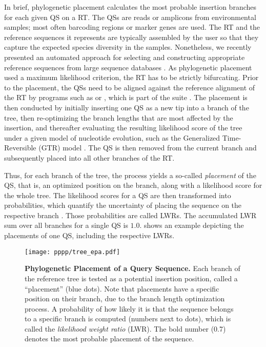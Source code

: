 In brief, phylogenetic placement calculates the most probable insertion branches for each given \acf{QS} on a \acf{RT}.
The \acp{QS} are reads or amplicons from environmental samples; most often barcoding regions or marker genes are used.
The \ac{RT} and the reference sequences it represents are typically assembled by the user
so that they capture the expected species diversity in the samples.
Nonetheless, we recently presented an automated approach
for selecting and constructing appropriate reference sequences from large sequence databases \cite{Czech2018}.
As phylogenetic placement used a maximum likelihood criterion, the \ac{RT} has to be strictly bifurcating.
Prior to the placement, the \acp{QS} need to be aligned against the reference alignment of the \ac{RT} by programs such as
 \cite{Berger2011a,Berger2012} or
, which is part of the  suite \cite{Eddy1998,Eddy2009}.
The placement is then conducted by initially inserting one \ac{QS} as a new tip into a branch of the tree,
then re-optimizing the branch lengths that are most affected by the insertion,
and thereafter evaluating the resulting likelihood score of the tree under a given model of nucleotide evolution,
such as the Generalized Time-Reversible (GTR) model \cite{Tavare1986}.
The \ac{QS} is then removed from the current branch and subsequently placed into all other branches of the \ac{RT}.

Thus, for each branch of the tree, the process yields a so-called \emph{placement} of the \ac{QS},
that is, an optimized position on the branch, along with a likelihood score for the whole tree.
The likelihood scores for a \ac{QS} are then transformed into probabilities,
which quantify the uncertainty of placing the sequence on the respective branch \cite{Strimmer2002,VonMering2007}.
Those probabilities are called \acp{LWR}.
The accumulated \ac{LWR} sum over all branches for a single \ac{QS} is $1.0$.
 shows an example depicting the placements of one \ac{QS}, including the respective \acp{LWR}.

\begin{figure}[hpbt]
    \centering
    \texttt{[image: pppp/tree\_epa.pdf]}
    \caption[Phylogenetic Placement of a Query Sequence]{
        \textbf{Phylogenetic Placement of a Query Sequence.}
        Each branch of the reference tree is tested as a potential insertion position, called a ``placement'' (blue dots).
        Note that placements have a specific position on their branch, due to the branch length optimization process.
        A probability of how likely it is that the sequence belongs to a specific branch is computed
        (numbers next to dots),
        which is called the \emph{likelihood weight ratio} (LWR).
        The bold number (0.7) denotes the most probable placement of the sequence.
    }
    \label{fig:tree_epa}
\end{figure}


